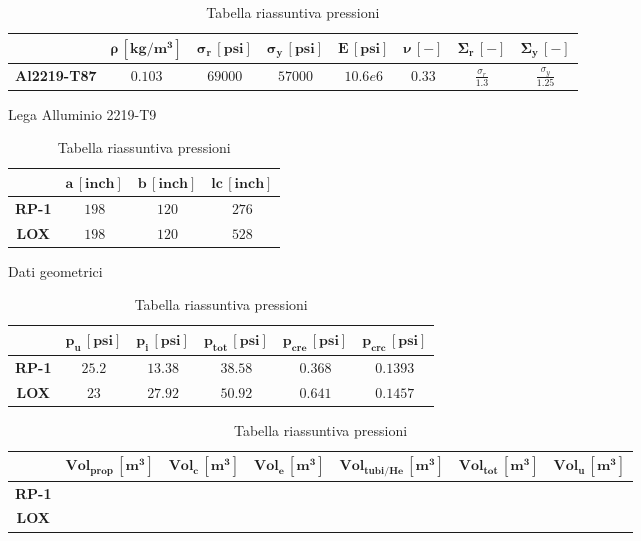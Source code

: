 \begin{table}[H]

\centering
\begin{tabular}{|c|c|c|c|c|c|c|c|}
\hline
& $\bm{\rho \, [kg/m^3]}$ & $\bm{\sigma_{r} \, [psi]}$ & $\bm{\sigma_{y} \, [psi]}$ & $\bm{E \, [psi]}$ & $\bm{\nu\, [-]}$& $\bm{\Sigma_{r}\, [-]}$ & $\bm{\Sigma_{y}\, [-]}$ \\
\hline
\textbf{Al2219-T87} & $0.103$ & $69000$ & $57000$ & $10.6e6$ & $0.33$ & $\frac{\sigma_{r}}{1.3}$ & $\frac{\sigma_{y}}{1.25}$ \\
\hline
\end{tabular}

\caption{Lega Alluminio 2219-T9}
\label{table:dati_materiale}

\vspace{5pt}

\begin{tabular}{|c|c|c|c|}
\hline
& $\bm{a \, [inch]}$ & $\bm{b \, [inch]}$ & $\bm{lc \, [inch]}$ \\
\hline
\textbf{RP-1} & $198$ & $120$ & $276$ \\
\hline
\textbf{LOX} & $198$ & $120$ & $528$ \\
\hline
\end{tabular}


\caption{Dati geometrici}
\label{table:dati_geometrici}

\vspace{5pt}

\begin{tabular}{|c|c|c|c|c|c|}
\hline
& $\bm{p_{u} \, [psi]}$ & $\bm{p_{i} \, [psi]}$ & $\bm{p_{tot} \, [psi]}$ & $\bm{p_{cre} \, [psi]}$ & $\bm{p_{crc} \, [psi]}$\\
\hline
\textbf{RP-1} & $25.2$ & $13.38$ & $38.58$ & $0.368$ & $0.1393$\\
\hline
\textbf{LOX} & $23$ & $27.92$ & $50.92$ & $0.641$ & $0.1457$\\
\hline
\end{tabular}


\caption{Tabella riassuntiva pressioni}
\label{table:pressioni}

\vspace{5pt}

\begin{tabular}{|c|c|c|c|c|c|c|}
\hline
& $\bm{Vol_{prop} \, [m^3]}$ & $\bm{Vol_{c} \, [m^3]}$ & $\bm{Vol_{e} \, [m^3]}$ & $\bm{Vol_{tubi/He} \, [m^3]}$ & $\bm{Vol_{tot} \, [m^3]}$ & $\bm{Vol_{u} \, [m^3]} $\\
\hline
\textbf{RP-1} & $ $ & $ $ & $ $ & $ $ & $ $ & $ $\\
\hline
\textbf{LOX} & $ $ & $ $ & $ $ & $ $ & $ $ & $ $\\
\hline
\end{tabular}



\end{table}
